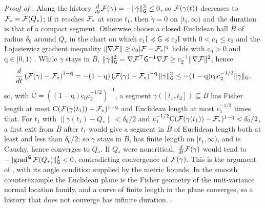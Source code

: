 \noindent\emph{Proof of .}
Along the history $\tfrac{d}{dt}\mathcal F(\gamma)=-\lVert\dot\gamma\rVert_{\mathsf
G}^2\leq0$, so $\mathcal F(\gamma(t))$ decreases to $\mathcal F_*=\mathcal F(Q_*)$; if it
reaches $\mathcal F_*$ at some $t_1$, then $\dot\gamma=0$ on $[t_1,\infty)$ and the
duration is that of a compact segment.  Otherwise choose a closed Euclidean ball $\bar B$
of radius $\delta_0$ around $Q_*$ in the chart on which
$\mathrm c_1\mathrm I\preceq\mathsf G\preceq\mathrm c_2\mathrm I$ with
$0<\mathrm c_1\leq\mathrm c_2$ and the {\L}ojasiewicz gradient inequality
$\lVert\nabla\mathcal F\rVert\geq\mathrm c_0|\mathcal F-\mathcal F_*|^{\mathrm q}$ holds with
$\mathrm c_0>0$ and $\mathrm q\in[0,1)$ \citep[Lemma~2.1]{absil2005convergence}.  While
$\gamma$ stays in $\bar B$,
$\lVert\dot\gamma\rVert_{\mathsf G}^2=\nabla\mathcal F^\top\mathsf G^{-1}\nabla\mathcal F
\geq\mathrm c_2^{-1}\lVert\nabla\mathcal F\rVert^2$, hence
\begin{equation}
\frac{d}{dt}\left(\mathcal F(\gamma)-\mathcal F_*\right)^{1-\mathrm q}
=-(1-\mathrm q)\left(\mathcal F(\gamma)-\mathcal F_*\right)^{-\mathrm q}
\lVert\dot\gamma\rVert_{\mathsf G}^2
\leq-(1-\mathrm q)\mathrm c_0\mathrm c_2^{-1/2}\lVert\dot\gamma\rVert_{\mathsf G},
\label{eq:hist-lojasiewicz-length-estimate}
\end{equation}
so, with $\mathrm C=((1-\mathrm q)\mathrm c_0\mathrm c_2^{-1/2})^{-1}$, a segment
$\gamma([t_1,t_2])\subseteq\bar B$ has Fisher length at most
$\mathrm C(\mathcal F(\gamma(t_1))-\mathcal F_*)^{1-\mathrm q}$ and Euclidean length at most
$\mathrm c_1^{-1/2}$ times that.  For $t_1$ with $\lVert\gamma(t_1)-Q_*\rVert<\delta_0/2$
and $\mathrm c_1^{-1/2}\mathrm C(\mathcal F(\gamma(t_1))-\mathcal F_*)^{1-\mathrm
q}<\delta_0/2$, a first exit from $\bar B$ after $t_1$ would give a segment in $\bar B$ of
Euclidean length both at least and less than $\delta_0/2$; so $\gamma$ stays in $\bar B$,
has finite length on $[t_1,\infty)$, and is Cauchy, hence converges to $Q_*$.  If $Q_*$
were noncritical, $\tfrac{d}{dt}\mathcal F(\gamma)$ would tend to
$-\lVert\operatorname{grad}^{\mathsf G}\mathcal F(Q_*)\rVert^2_{\mathsf G}<0$,
contradicting convergence of $\mathcal F(\gamma)$.  This is the argument of
\citet[Theorem~2.2]{absil2005convergence}, with its angle condition supplied by the
metric bounds.  In the smooth counterexample the Euclidean plane is the Fisher geometry
of the unit-variance normal location family, and a curve of finite length in the plane
converges, so a history that does not converge has infinite duration.  $\square$

